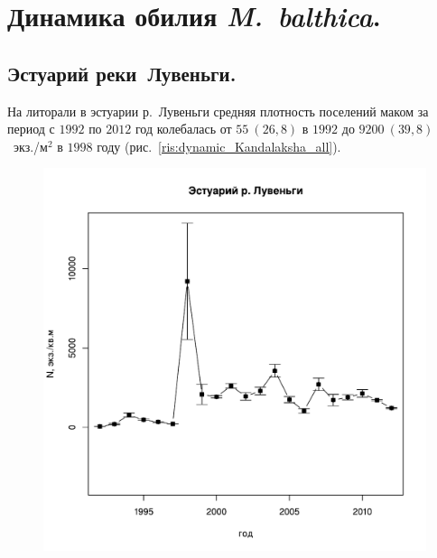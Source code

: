 	\chapter{Динамика обилия {\it M.~balthica}.}

		\section{Эстуарий реки~Лувеньги.}


На литорали в эстуарии р.~Лувеньги средняя плотность поселений маком за период с $1992$ по $2012$ год колебалась от $55~(26,8)$ в $1992$ до $9200~(39,8)$~экз./м$^2$ в $1998$ году (рис.~\ref{ris:dynamic_Kandalaksha_all}). 
	\begin{figure}[p]
	
	\begin{minipage}[b]{.49\linewidth}
	\begin{center}
	\includegraphics[width=\linewidth]{../White_Sea/Estuatiy_Luvenga/N_dynamic1.pdf}


\end{center}
\end{minipage}
\end{figure}
